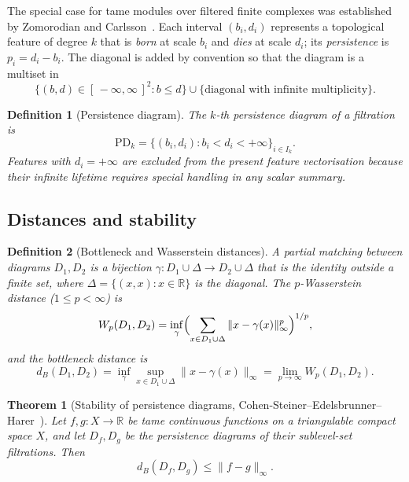 \documentclass[onluarkali,ingilizce,yukseklisans,karton,LisansustuEgitim]{itutez}
\newtheorem{definition}{Definition}[chapter]
\newtheorem{theorem}{Theorem}[chapter]
\providecommand{\R}{\mathbb{R}}
\providecommand{\1}{\mathbf{1}}
\providecommand{\PD}{\mathrm{PD}}
\begin{document}
The special case for tame modules over filtered finite complexes was established by Zomorodian and Carlsson~\parencite{edelsbrunner2002topological}. Each interval $(b_i,d_i)$ represents a topological feature of degree $k$ that is \emph{born} at scale $b_i$ and \emph{dies} at scale $d_i$; its \emph{persistence} is $p_i=d_i-b_i$. The diagonal is added by convention so that the diagram is a multiset in
\[
  \{(b,d)\in[\,-\infty,\infty\,]^2:b\leq d\}\cup\{\text{diagonal with infinite multiplicity}\}.
\]

\begin{definition}[Persistence diagram]
\label{def:pd}
The \emph{$k$-th persistence diagram} of a filtration is
\begin{equation}
  \PD_k=\bigl\{(b_i,d_i):b_i<d_i<+\infty\bigr\}_{i\in I_k}.
  \label{eq:pd}
\end{equation}
Features with $d_i=+\infty$ are excluded from the present feature vectorisation because their infinite lifetime requires special handling in any scalar summary.
\end{definition}

\subsection{Distances and stability}
\label{subsubsec:pd-distances}

\begin{definition}[Bottleneck and Wasserstein distances]
\label{def:bottleneck}
A \emph{partial matching} between diagrams $D_1,D_2$ is a bijection $\gamma\colon D_1\cup\Delta\to D_2\cup\Delta$ that is the identity outside a finite set, where $\Delta=\{(x,x):x\in\R\}$ is the diagonal. The \emph{$p$-Wasserstein distance} ($1\leq p<\infty$) is
\[
  W_p(D_1,D_2)=\inf_\gamma\Bigl(\sum_{x\in D_1\cup\Delta}\|x-\gamma(x)\|_\infty^p\Bigr)^{1/p},
\]
and the \emph{bottleneck distance} is
\[
  d_B(D_1,D_2)=\inf_\gamma\sup_{x\in D_1\cup\Delta}\|x-\gamma(x)\|_\infty=\lim_{p\to\infty}W_p(D_1,D_2).
\]
\end{definition}

\begin{theorem}[Stability of persistence diagrams, Cohen-Steiner--Edelsbrunner--Harer~\parencite{cohen2007stability}]
\label{thm:stability}
Let $f,g\colon X\to\R$ be tame continuous functions on a triangulable compact space $X$, and let $D_f,D_g$ be the persistence diagrams of their sublevel-set filtrations. Then
\[
  d_B(D_f,D_g)\leq\|f-g\|_\infty.
\]
\end{theorem}
\end{document}
